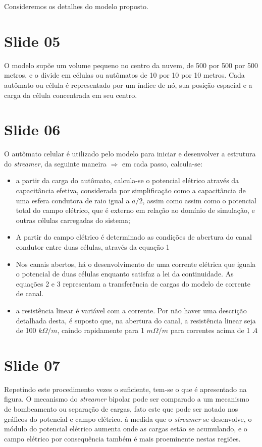 \documentclass[a4paper, 12pt, onecolumn,singlespacing]{article}
\begin{document}
	Consideremos os detalhes do modelo proposto.
	
	\section{Slide 05}
	
		O modelo supõe um volume pequeno no centro da nuvem, de 500 por 500 por 500 metros, e o divide em células ou autômatos de 10 por 10 por 10 metros. Cada autômato ou célula é representado por um índice de nó, sua posição espacial e a carga da célula concentrada em seu centro.
		
	\section{Slide 06}
	
	O autômato celular é utilizado pelo modelo para iniciar e desenvolver a estrutura do \textit{streamer}, da seguinte maneira $\Rightarrow$ em cada passo, calcula-se:
	
	\begin{itemize}
		\item a partir da carga do autômato, calcula-se o potencial elétrico através da capacitância efetiva, considerada por simplificação como a capacitância de uma esfera condutora de raio igual a $a/2$, assim como assim como o potencial total do campo elétrico, que é externo em relação ao domínio de simulação, e outras células carregadas do sistema;
		\item A partir do campo elétrico é determinado as condições de abertura do canal condutor entre duas células, através da equação 1
		\item Nos canais abertos, há o desenvolvimento de uma corrente elétrica que iguala o potencial de duas células enquanto satisfaz a lei da continuidade. As equações 2 e 3 representam a transferência de cargas do modelo de corrente de canal. 
		\item a resistência linear é variável com a corrente. Por não haver uma descrição detalhada desta, é suposto que, na abertura do canal, a resistência linear seja de 100 $k\Omega/m$, caindo rapidamente para 1 $m\Omega/m$ para correntes acima de 1 $A$
	\end{itemize}
	
	\section{Slide 07}

	Repetindo este procedimento vezes o suficiente, tem-se o que é apresentado na figura. O mecanismo do \textit{streamer} bipolar pode ser comparado a um mecanismo de bombeamento ou separação de cargas, fato este que pode ser notado nos gráficos do potencial e campo elétrico. à medida que o \textit{streamer} se desenvolve, o módulo do potencial elétrico aumenta onde as cargas estão se acumulando, e o campo elétrico por consequência também é mais proeminente nestas regiões.
	
\end{document}
